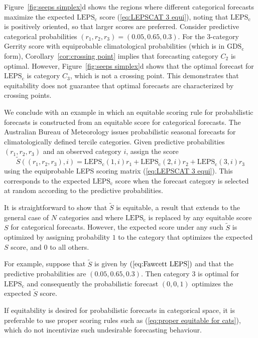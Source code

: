 \documentclass[10pt]{article} %
\theoremstyle{theorem}
\theoremstyle{definition}
\newcommand{\GDSc}{\mathrm{GDS}_\mathrm{c}}
\newcommand{\LEPSc}{\mathrm{LEPS}_\mathrm{c}}
\begin{document}
Figure~\ref{fig:seeps simplex}d shows the regions where different categorical forecasts maximize the expected $\LEPSc$ score (\ref{eq:LEPSCAT 3 equi}), noting that $\LEPSc$ is positively oriented, so that larger scores are preferred. Consider predictive categorical probabilities $(r_1,r_2,r_3)=(0.05,0.65,0.3)$. For the 3-category Gerrity score with equiprobable climatological probabilities (which is in $\GDSc$ form), Corollary~\ref{cor:crossing point} implies that forecasting category $C_2$ is optimal. However, Figure~\ref{fig:seeps simplex}d shows that the optimal forecast for $\LEPSc$ is category $C_3$, which is not a crossing point. This demonstrates that equitability does not guarantee that optimal forecasts are characterized by crossing points.

We conclude with an example in which an equitable scoring rule for probabilistic forecasts is constructed from an equitable score for categorical forecasts. The Australian Bureau of Meteorology issues probabilistic seasonal forecasts for climatologically defined tercile categories. Given predictive probabilities $(r_1,r_2,r_3)$ and an observed category $i$, \citet{fawcett2005verification} assign the score
\begin{equation}\label{eq:Fawcett LEPS}
\tilde{S}((r_1,r_2,r_3),i)
= \LEPSc(1,i)r_1 + \LEPSc(2,i)r_2 + \LEPSc(3,i)r_3
\end{equation}
using the equiprobable LEPS scoring matrix (\ref{eq:LEPSCAT 3 equi}). This corresponds to the expected $\LEPSc$ score when the forecast category is selected at random according to the predictive probabilities.

It is straightforward to show that $\tilde{S}$ is equitable, a result that extends to the general case of $N$ categories and where $\LEPSc$ is replaced by any equitable score $S$ for categorical forecasts. However, the expected score under any such $\tilde{S}$ is optimized by assigning probability $1$ to the category that optimizes the expected $S$ score, and $0$ to all others.

For example, suppose that $\tilde{S}$ is given by $(\ref{eq:Fawcett LEPS})$ and that the predictive probabilities are $(0.05,0.65,0.3)$. Then category $3$ is optimal for $\LEPSc$ and consequently the probabilistic forecast $(0,0,1)$ optimizes the expected $\tilde{S}$ score.

If equitability is desired for probabilistic forecasts in categorical space, it is preferable to use proper scoring rules such as (\ref{eq:proper equitable for cats}), which do not incentivize such undesirable forecasting behaviour.
\end{document}
